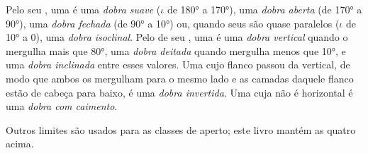 \begin{definition}\label{def:b1:faults-folds-fabrics:fold-classes}
Pelo seu , uma  é uma \emph{dobra suave} ($\iota$ de \ang{180} a \ang{170}), uma \emph{dobra aberta} (de \ang{170} a \ang{90}), uma \emph{dobra fechada} (de \ang{90} a
\ang{10}) ou, quando seus  são quase paralelos ($\iota$ de \ang{10} a $0$), uma \emph{dobra isoclinal}. Pelo  de seu , uma  é uma \emph{dobra vertical} quando o  mergulha mais que \ang{80}, uma \emph{dobra deitada} quando mergulha menos que \ang{10}, e uma \emph{dobra inclinada} entre esses valores. Uma  cujo flanco passou da vertical, de modo que ambos os  mergulham para o mesmo lado e as camadas daquele flanco estão de cabeça para baixo, é uma \emph{dobra invertida}. Uma  cuja  não é horizontal é uma \emph{dobra com caimento}.
\end{definition}
Outros limites são usados para as classes de aperto; este livro mantém as quatro acima.

